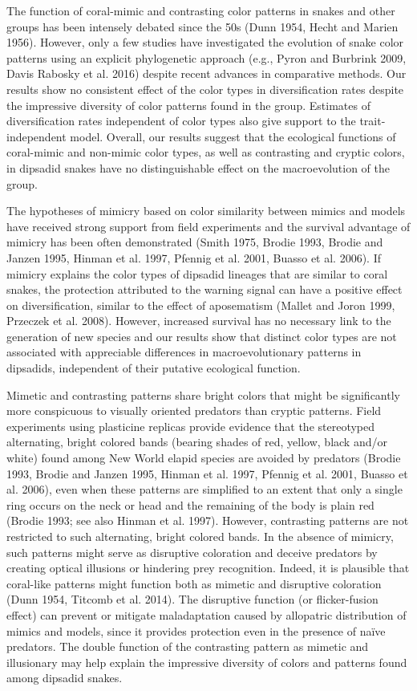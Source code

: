 The function of coral-mimic and contrasting color patterns in snakes and other groups has been intensely debated since the 50s (Dunn 1954, Hecht and Marien 1956). However, only a few studies have investigated the evolution of snake color patterns using an explicit phylogenetic approach (e.g., Pyron and Burbrink 2009, Davis Rabosky et al. 2016) despite recent advances in comparative methods. Our results show no consistent effect of the color types in diversification rates despite the impressive diversity of color patterns found in the group. Estimates of diversification rates independent of color types also give support to the trait-independent model. Overall, our results suggest that the ecological functions of coral-mimic and non-mimic color types, as well as contrasting and cryptic colors, in dipsadid snakes have no distinguishable effect on the macroevolution of the group.

The hypotheses of mimicry based on color similarity between mimics and models have received strong support from field experiments and the survival advantage of mimicry has been often demonstrated (Smith 1975, Brodie 1993, Brodie and Janzen 1995, Hinman et al. 1997, Pfennig et al. 2001, Buasso et al. 2006). If mimicry explains the color types of dipsadid lineages that are similar to coral snakes, the protection attributed to the warning signal can have a positive effect on diversification, similar to the effect of aposematism (Mallet and Joron 1999, Przeczek et al. 2008). However, increased survival has no necessary link to the generation of new species and our results show that distinct color types are not associated with appreciable differences in macroevolutionary patterns in dipsadids, independent of their putative ecological function.

Mimetic and contrasting patterns share bright colors that might be significantly more conspicuous to visually oriented predators than cryptic patterns. Field experiments using plasticine replicas provide evidence that the stereotyped alternating, bright colored bands (bearing shades of red, yellow, black and/or white) found among New World elapid species are avoided by predators (Brodie 1993, Brodie and Janzen 1995, Hinman et al. 1997, Pfennig et al. 2001, Buasso et al. 2006), even when these patterns are simplified to an extent that only a single ring occurs on the neck or head and the remaining of the body is plain red (Brodie 1993; see also Hinman et al. 1997). However, contrasting patterns are not restricted to such alternating, bright colored bands. In the absence of mimicry, such patterns might serve as disruptive coloration and deceive predators by creating optical illusions or hindering prey recognition. Indeed, it is plausible that coral-like patterns might function both as mimetic and disruptive coloration (Dunn 1954, Titcomb et al. 2014). The disruptive function (or flicker-fusion effect) can prevent or mitigate maladaptation caused by allopatric distribution of mimics and models, since it provides protection even in the presence of naïve predators. The double function of the contrasting pattern as mimetic and illusionary may help explain the impressive diversity of colors and patterns found among dipsadid snakes.


